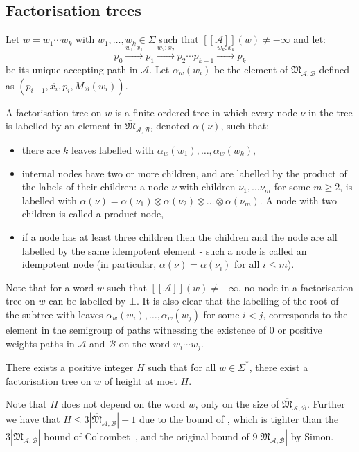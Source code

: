\documentclass{lmcs}
\theoremstyle{remark}
\newcommand{\ideal}{\mathfrak{M}}
\newcommand{\autA}{\mathcal{A}}
\newcommand{\autB}{\mathcal{B}}
\newcommand{\brfunc}[1]{[\![#1]\!]}
\newcommand{\funcA}{\brfunc{\autA}}
\theoremstyle{remark}
\begin{document}
\subsection{Factorisation trees}
Let $w = w_1\cdots w_k$ with $w_1, \ldots, w_k \in \Sigma$ such that $\funcA(w) \neq -\infty$ and let:
$$p_0 \xrightarrow{w_1:x_1} p_1 \xrightarrow{w_2:x_2} p_2 \dotsm p_{k-1}\xrightarrow{w_{k}:x_k} p_k$$ 
be its unique accepting path in $\autA$. Let $\alpha_w(w_i)$ be the element of $\overline{\ideal}_{\autA,\autB}$ defined as $(p_{i-1},\overline{x_i},p_i,\overline{M_\autB(w_i)})$.

A factorisation tree on $w$ is a finite ordered tree in which every node $\nu$ in the tree is labelled by an element in $\overline{\ideal}_{\autA,\autB}$, denoted $\alpha(\nu)$, such that:
\begin{itemize}
\item there are $k$ leaves labelled with $\alpha_w(w_1), \ldots, \alpha_w(w_k)$, 
\item internal nodes have two or more children, and are labelled by the product of the labels of their children: a node $\nu$ with children $\nu_1,\dots \nu_m$ for some $m\ge 2$, is labelled with $\alpha(\nu) = \alpha(\nu_1)\otimes \alpha(\nu_2) \otimes \dots \otimes \alpha(\nu_m)$. A node with two children is called a product node,
\item if a node has at least three children then the children and the node are all labelled by the same idempotent element - such a node is called an idempotent node (in particular, $\alpha(\nu) = \alpha(\nu_i)$ for all $i\le m$).
\end{itemize}

Note that for a word $w$ such that $\funcA(w) \neq -\infty$, no node in a factorisation tree on $w$ can be labelled by $\bot$. It is also clear that the labelling of the root of the subtree with leaves $\alpha_w(w_i), \ldots, \alpha_w(w_j)$ for some $i<j$, corresponds to the element in the semigroup of paths witnessing the existence of $0$ or positive weights paths in $\autA$ and $\autB$ on the word $w_i \cdots w_j$.


\begin{thm}
\label{theorem:Simon90}
There exists a positive integer $H$ such that for all $w\in\Sigma^*$, there exist a factorisation tree on $w$ of height at most $H$.
\end{thm}

Note that $H$ does not depend on the word $w$, only on the size of $\overline{\ideal}_{\autA,\autB}$. Further we have that $H \le 3|\overline{\ideal}_{\autA,\autB}|-1$ due to the bound of \cite{Kufleitner08}, which is tighter than the $3|\overline{\ideal}_{\autA,\autB}|$ bound of Colcombet~\cite{Colcombet07}, and the original bound of $9|\overline{\ideal}_{\autA,\autB}|$  by Simon.
\end{document}
